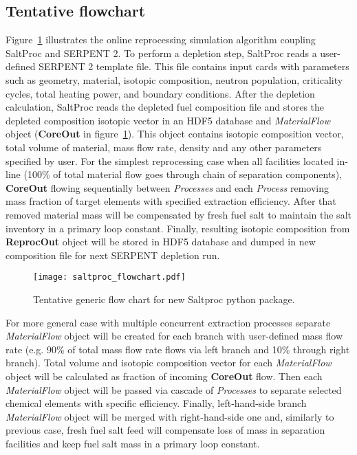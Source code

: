 \subsection{Tentative flowchart}
Figure~\ref{fig:saltproc_flow} illustrates the online reprocessing simulation 
algorithm coupling SaltProc and SERPENT 2. To perform a depletion step, 
SaltProc reads a user-defined SERPENT 2 template file. This file contains input 
cards with parameters such as geometry, material, isotopic composition, neutron 
population, criticality cycles, total heating power, and boundary conditions.  
After the depletion calculation, SaltProc reads the depleted fuel composition 
file and stores the depleted composition isotopic vector in an HDF5 database 
and \textit{MaterialFlow} object (\textbf{CoreOut} in 
figure~\ref{fig:saltproc_flow}). This object contains isotopic composition 
vector, total volume of material, mass flow rate, density and any other 
parameters specified by user. For the simplest reprocessing case when all 
facilities located in-line (100\% of total material flow goes through 
chain of separation components), \textbf{CoreOut} flowing sequentially 
between \textit{Processes} and each \textit{Process} removing mass fraction 
of target elements with specified extraction efficiency. After that removed 
material mass will be compensated by fresh fuel salt to maintain the salt 
inventory in a primary loop constant. Finally, resulting isotopic composition 
from \textbf{ReprocOut} object will be stored in HDF5 database and 
dumped in new composition file for next SERPENT depletion run. 
\begin{figure}[ht!] %
  \texttt{[image: saltproc\_flowchart.pdf]}
  \caption{Tentative generic flow chart for new Saltproc python package.}
  \label{fig:saltproc_flow}
\end{figure}

For more general case with multiple concurrent extraction processes separate 
\textit{MaterialFlow} object will be created for each branch with user-defined 
mass flow rate (e.g. 90\% of total mass flow rate flows via left branch and 
10\% through right branch). Total volume and isotopic composition vector 
for each \textit{MaterialFlow} object will be calculated as fraction of incoming 
\textbf{CoreOut} flow. Then each \textit{MaterialFlow} object will be passed via 
cascade of \textit{Processes} to separate selected chemical elements with 
specific efficiency. Finally, left-hand-side branch \textit{MaterialFlow} object 
will be merged with right-hand-side one and, similarly to previous case, fresh 
fuel salt feed will compensate loss of mass in separation facilities and keep 
fuel salt mass in a primary loop constant.

